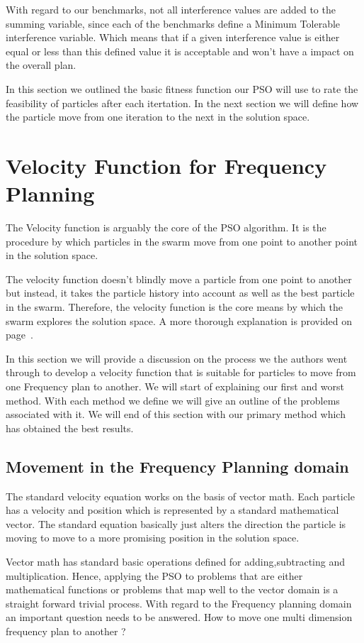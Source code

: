 With regard to our benchmarks, not all interference values are added to the summing variable, since each of the benchmarks define a Minimum Tolerable interference variable. Which means that if a given interference value is either equal or
less than this defined value it is acceptable and won't have a impact on the overall plan.

In this section we outlined the basic fitness function our PSO will use to rate the feasibility of particles after each itertation. In the next section we will define how the particle move from one iteration to the next in the solution space.

\section{Velocity Function for Frequency Planning}
\label{sec:velocityFAP}
The Velocity function is arguably the core of the PSO algorithm. It is the procedure by which particles in the swarm move from one point to another point in the solution space. 

The velocity function doesn't blindly move a particle from one point to another but instead, it takes the particle history into account as well as the best particle in the swarm. Therefore, the velocity function is the core means by which
the swarm explores the solution space. A more thorough explanation is provided on page~\pageref{sec:particleVelocity}.

In this section we will provide a discussion on the process we the authors went through to develop a velocity function that is suitable for particles to move from one Frequency plan to another. We will start of explaining our first and worst
method. With each method we define we will give an outline of the problems associated with it. We will end of this section with our primary method which has obtained the best results.

\subsection{Movement in the Frequency Planning domain}
The standard velocity equation works on the basis of vector math. Each particle has a velocity and position which is represented by a standard mathematical vector. The standard equation basically just alters the direction the particle is moving
to move to a more promising position in the solution space.

Vector math has standard basic operations defined for adding,subtracting and multiplication. Hence, applying the PSO to problems that are either mathematical functions or problems that map well to the vector domain is a straight forward trivial process.
With regard to the Frequency planning domain an important question needs to be answered. How to move one multi dimension frequency plan to another ?


